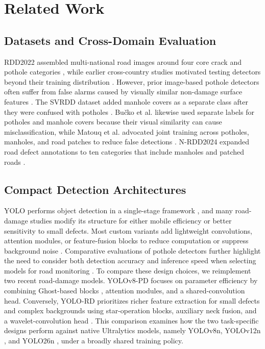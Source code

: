 \documentclass[conference]{IEEEtran}
\begin{document}
\section{Related Work}
\subsection{Datasets and Cross-Domain Evaluation}
RDD2022 assembled multi-national road images around four core crack and pothole categories \cite{Arya2024846}, while earlier cross-country studies motivated testing detectors beyond their training distribution \cite{arya2021deep}. However, prior image-based pothole detectors often suffer from false alarms caused by visually similar non-damage surface features \cite{bucko2022computer}. The SVRDD dataset added manhole covers as a separate class after they were confused with potholes \cite{Shi_2026}. Bu{\v{c}}ko et al. likewise used separate labels for potholes and manhole covers because their visual similarity can cause misclassification, while Matouq et al. advocated joint training across potholes, manholes, and road patches to reduce false detections \cite{bucko2022computer,matouq2024ai}. N-RDD2024 expanded road defect annotations to ten categories that include manholes and patched roads \cite{kaya2024nrdd2024}.

\subsection{Compact Detection Architectures}
YOLO performs object detection in a single-stage framework \cite{redmon2016you}, and many road-damage studies modify its structure for either mobile efficiency or better sensitivity to small defects. Most custom variants add lightweight convolutions, attention modules, or feature-fusion blocks to reduce computation or suppress background noise \cite{Wu2023,Li2024,Shi_2026}. Comparative evaluations of pothole detectors further highlight the need to consider both detection accuracy and inference speed when selecting models for road monitoring \cite{rianto2025pothole}. To compare these design choices, we reimplement two recent road-damage models. YOLOv8-PD \cite{Zeng2024} focuses on parameter efficiency by combining Ghost-based blocks \cite{han2020ghostnet}, attention modules, and a shared-convolution head. Conversely, YOLO-RD \cite{Wang2025} prioritizes richer feature extraction for small defects and complex backgrounds using star-operation blocks, auxiliary neck fusion, and a wavelet-convolution head \cite{finder2024wtconv}. This comparison examines how the two task-specific designs perform against native Ultralytics models, namely YOLOv8n, YOLOv12n \cite{tian2025yolov12_primary}, and YOLO26n \cite{sapkota2025yolo26_primary}, under a broadly shared training policy.
\end{document}
